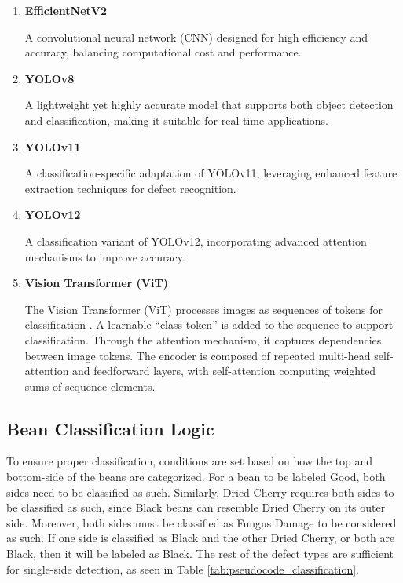 \begin{enumerate}
	\item \textbf{EfficientNetV2}
	 
	A convolutional neural network (CNN) designed for high efficiency and accuracy, balancing computational cost and performance.
	
	\item \textbf{YOLOv8}
	
	A lightweight yet highly accurate model that supports both object detection and classification, making it suitable for real-time applications.

	\item \textbf{YOLOv11}
	
	A classification-specific adaptation of YOLOv11, leveraging enhanced feature extraction techniques for defect recognition.
	
	\item \textbf{YOLOv12}
	
	A classification variant of YOLOv12, incorporating advanced attention mechanisms to improve accuracy.

	\item \textbf{Vision Transformer (ViT)}

	The Vision Transformer (ViT) processes images as sequences of tokens for classification \cite{Dosovitskiy_Beyer_Kolesnikov_Weissenborn_Zhai_Unterthiner_Dehghani_Minderer_Heigold_Gelly_2021}. A learnable “class token” is added to the sequence to support classification. Through the attention mechanism, it captures dependencies between image tokens. The encoder is composed of repeated multi-head self-attention and feedforward layers, with self-attention computing weighted sums of sequence elements.
\end{enumerate}

\subsection{Bean Classification Logic}
To ensure proper classification, conditions are set based on how the top and bottom-side of the beans are categorized. For a bean to be labeled Good, both sides need to be classified as such. Similarly, Dried Cherry requires both sides to be classified as such, since Black beans can resemble Dried Cherry on its outer side. Moreover, both sides must be classified as Fungus Damage to be considered as such. If one side is classified as Black and the other Dried Cherry, or both are Black, then it will be labeled as Black.  The rest of the defect types are sufficient for single-side detection, as seen in Table \ref{tab:pseudocode_classification}.


